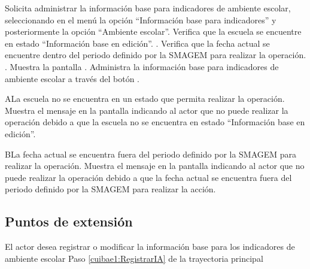  \begin{UCtrayectoria}
    \UCpaso[\UCactor] Solicita administrar la información base para indicadores de ambiente escolar, seleccionando en el menú  la opción ``Información base para indicadores'' y posteriormente la opción ``Ambiente escolar''. 
    \UCpaso[\UCsist] Verifica que la escuela se encuentre en estado ``Información base en edición''. .
    \UCpaso[\UCsist] Verifica que la fecha actual se encuentre dentro del periodo definido por la SMAGEM para realizar la operación. .
    \UCpaso[\UCsist] Muestra la pantalla .
    \UCpaso[\UCactor] Administra la información base para indicadores de ambiente escolar a través del botón \botEdit. \label{cuibae1:RegistrarIA}
 \end{UCtrayectoria}

  \begin{UCtrayectoriaA}{A}{La escuela no se encuentra en un estado que permita realizar la operación.}
    \UCpaso[\UCsist] Muestra el mensaje  en la pantalla  indicando al actor que no puede realizar la operación debido a que la escuela no se encuentra en estado ``Información base en edición''. 
 \end{UCtrayectoriaA}
 
    \begin{UCtrayectoriaA}{B}{La fecha actual se encuentra fuera del periodo definido por la SMAGEM para realizar la operación.}
    \UCpaso[\UCsist] Muestra el mensaje  en la pantalla  indicando al actor que no puede realizar la operación debido a que la fecha actual se encuentra fuera del periodo definido por la SMAGEM para realizar la acción. 
 \end{UCtrayectoriaA}

\subsection{Puntos de extensión}

\UCExtensionPoint
{El actor desea registrar o modificar la información base para los indicadores de ambiente escolar}
{ Paso \ref{cuibae1:RegistrarIA} de la trayectoria principal}
{}
